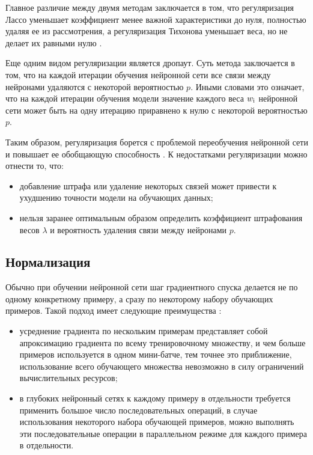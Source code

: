 Главное различие между двумя методам заключается в том, что регуляризация Лассо уменьшает коэффициент менее важной характеристики до нуля, полностью удаляя ее из рассмотрения, а регуляризация Тихонова уменьшает веса, но не делает их равными нулю \cite{regulisation}.

Еще одним видом регуляризации является дропаут. Суть метода заключается в том, что на каждой итерации обучения нейронной сети все связи между нейронами удаляются с некоторой вероятностью $p$. Иными словами это означает, что на каждой итерации обучения модели значение каждого веса $w_{\rm{i}}$ нейронной сети может быть на одну итерацию приравнено к нулю с некоторой вероятностью $p$.

Таким образом, регуляризация борется с проблемой переобучения нейронной сети и повышает ее обобщающую способность \cite{regulisation}. К недостатками регуляризации можно отнести то, что:
\begin{itemize}
	\item добавление штрафа или удаление некоторых связей может привести к ухудшению точности модели на обучающих данных;
	\item нельзя заранее оптимальным образом определить коэффициент штрафования весов $\lambda$ и вероятность удаления связи между нейронами $p$.
\end{itemize}

\subsection{Нормализация}\label{sec:normalisation}
Обычно при обучении нейронной сети шаг градиентного спуска делается не по одному конкретному примеру, а сразу по некоторому набору обучающих примеров. Такой подход имеет следующие преимущества \cite{regulisation}:
\begin{itemize}
	\item усреднение градиента по нескольким примерам представляет собой апроксимацию градиента по всему тренировочному множеству, и чем больше примеров используется в одном мини-батче, тем точнее это приближение, использование всего обучающего множества невозможно в силу ограничений вычислительных ресурсов;
	\item в глубоких нейронный сетях к каждому примеру в отдельности требуется применить большое число последовательных операций, в случае использования некоторого набора обучающей примеров, можно выполнять эти последовательные операции в параллельном режиме для каждого примера в отдельности.
\end{itemize}

